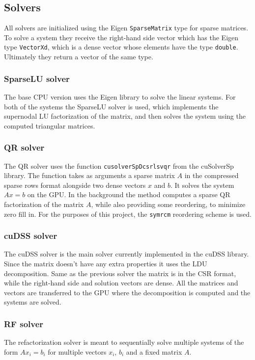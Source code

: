 \documentclass{article}
\begin{document}
\subsection{Solvers}
All solvers are initialized using the Eigen \verb|SparseMatrix| type for sparse matrices. 
To solve a system they receive the right-hand side vector which has the Eigen type \verb|VectorXd|,
which is a dense vector whose elements have the type \verb|double|. Ultimately they return 
a vector of the same type.
\subsubsection{SparseLU solver}
The base CPU version uses the Eigen library to solve the linear systems. For both of the systems 
the SparseLU solver is used, which implements the supernodal LU factorization of the matrix, and then
solves the system using the computed triangular matrices.
\subsubsection{QR solver}
The QR solver uses the function \verb|cusolverSpDcsrlsvqr| from the cuSolverSp library. 
The function takes as arguments a sparse matrix \(A\) in the 
compressed sparse rows format alongside two dense vectors \(x\) and \(b\). It solves the 
system \(Ax=b\) on the GPU. In the background the method computes a sparse QR factorization of the matrix \(A\),
while also providing some reordering, to minimize zero fill in. For the purposes of this project,
the \verb|symrcm| reordering scheme is used.
\subsubsection{cuDSS solver}
The cuDSS solver is the main solver currently implemented in the cuDSS library. Since the matrix 
doesn't have any extra properties it uses the LDU decomposition. Same as the previous 
solver the matrix is in the CSR format, while the right-hand side and solution vectors
are dense. All the matrices and vectors are transferred to the GPU where the decomposition is 
computed and the systems are solved.
\subsubsection{RF solver}
The refactorization solver is meant to sequentially solve multiple systems of the form 
\(A x_i = b_i\) for multiple vectors \(x_i\), \(b_i\) and a fixed matrix \(A\). 
\end{document}
